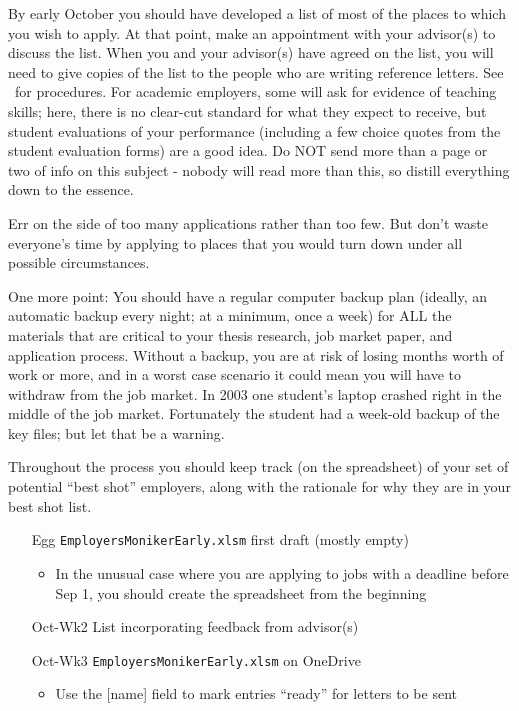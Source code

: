 \documentclass{\classes/econtex}
\begin{document}
By early October you should have developed a list of most of the places to which you wish to apply.  At that point, make an appointment with your advisor(s) to discuss the list.  When you and your advisor(s) have agreed on the list, you will need to give copies of the list to the people who are writing reference letters.  See \recLet~for procedures. For academic employers, some will ask for evidence of teaching skills; here, there is no clear-cut standard for what they expect to receive, but student evaluations of your performance (including a few choice quotes from the student evaluation forms) are a good idea.  Do NOT send more than a page or two of info on this subject - nobody will read more than this, so distill everything down to the essence.

Err on the side of too many applications rather than too few.  But
don't waste everyone's time by applying to places that you would turn
down under all possible circumstances.

One more point: You should have a regular computer backup plan
(ideally, an automatic backup every night; at a minimum, once a week)
for ALL the materials that are critical to your thesis research,
job market paper, and application process.  Without a backup, you are
at risk of losing months worth of work or more, and in a worst case
scenario it could mean you will have to withdraw from the job market.
In 2003 one student's laptop crashed right in the middle of the job
market.  Fortunately the student had a week-old backup of the key
files; but let that be a warning.

\hypertarget{best-shot}{}
Throughout the process you should keep track (on the spreadsheet) of your set of potential ``best shot'' employers, along with the rationale for why they are in your best shot list.

\begin{enumerate}
\item[Egg] \texttt{EmployersMonikerEarly.xlsm} first draft (mostly empty)
  \begin{itemize}
  \item In the unusual case where you are applying to jobs with a deadline before Sep 1, you should create the spreadsheet from the beginning
  \end{itemize}
\item[Oct-Wk2] List incorporating feedback from advisor(s)
\item[Oct-Wk3] \texttt{EmployersMonikerEarly.xlsm} on OneDrive
  \begin{itemize}
    \item Use the [name] field to mark entries ``ready'' for letters to be sent
    \end{itemize} 
\end{enumerate}
\end{document}
